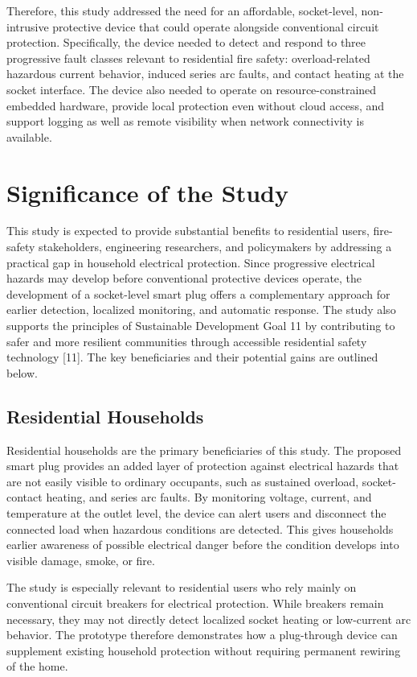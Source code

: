 Therefore, this study addressed the need for an affordable, socket-level,
non-intrusive protective device that could operate alongside
conventional circuit protection. Specifically, the device needed to
detect and respond to three progressive fault classes relevant to
residential fire safety: overload-related hazardous current behavior,
induced series arc faults, and contact heating at the socket interface.
The device also needed to operate on resource-constrained embedded
hardware, provide local protection even without cloud access, and
support logging as well as remote visibility when network connectivity is
available.

\section{Significance of the Study}\label{significance-of-the-study}

This study is expected to provide substantial benefits to residential
users, fire-safety stakeholders, engineering researchers, and
policymakers by addressing a practical gap in household electrical
protection. Since progressive electrical hazards may develop before
conventional protective devices operate, the development of a
socket-level smart plug offers a complementary approach for earlier
detection, localized monitoring, and automatic response. The study also
supports the principles of Sustainable Development Goal 11 by
contributing to safer and more resilient communities through
accessible residential safety technology {[}11{]}. The key beneficiaries
and their potential gains are outlined below.

\subsection{Residential Households}\label{residential-households}

Residential households are the primary beneficiaries of this study. The
proposed smart plug provides an added layer of protection against
electrical hazards that are not easily visible to ordinary occupants,
such as sustained overload, socket-contact heating, and series arc
faults. By monitoring voltage, current, and temperature at the outlet
level, the device can alert users and disconnect the connected load when
hazardous conditions are detected. This gives households earlier
awareness of possible electrical danger before the condition develops
into visible damage, smoke, or fire.

The study is especially relevant to residential users who rely
mainly on conventional circuit breakers for electrical protection. While
breakers remain necessary, they may not directly detect localized socket
heating or low-current arc behavior. The prototype therefore
demonstrates how a plug-through device can supplement existing household
protection without requiring permanent rewiring of the home.

